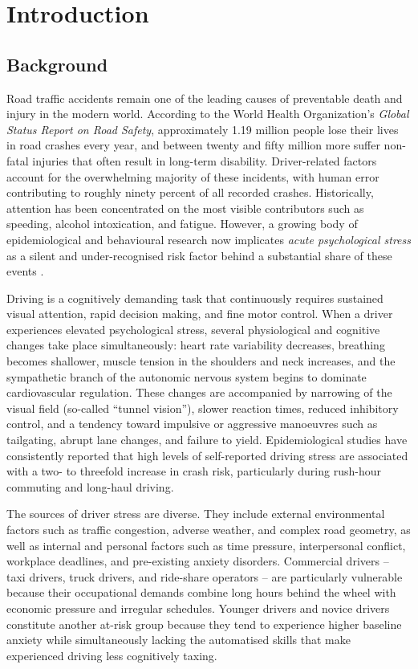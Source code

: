 \chapter{Introduction}
\label{ch:introduction}

\section{Background}
\label{sec:background}

Road traffic accidents remain one of the leading causes of preventable
death and injury in the modern world. According to the World Health
Organization's \emph{Global Status Report on Road Safety}, approximately
1.19 million people lose their lives in road crashes every year, and
between twenty and fifty million more suffer non-fatal injuries that
often result in long-term disability. Driver-related factors account
for the overwhelming majority of these incidents, with human error
contributing to roughly ninety percent of all recorded crashes.
Historically, attention has been concentrated on the most visible
contributors such as speeding, alcohol intoxication, and fatigue.
However, a growing body of epidemiological and behavioural research
now implicates \emph{acute psychological stress} as a silent and
under-recognised risk factor behind a substantial share of these
events \citep{sharma2012driver}.

Driving is a cognitively demanding task that continuously requires
sustained visual attention, rapid decision making, and fine motor
control. When a driver experiences elevated psychological stress,
several physiological and cognitive changes take place simultaneously:
heart rate variability decreases, breathing becomes shallower, muscle
tension in the shoulders and neck increases, and the sympathetic branch
of the autonomic nervous system begins to dominate cardiovascular
regulation. These changes are accompanied by narrowing of the visual
field (so-called ``tunnel vision''), slower reaction times, reduced
inhibitory control, and a tendency toward impulsive or aggressive
manoeuvres such as tailgating, abrupt lane changes, and failure to
yield. Epidemiological studies have consistently reported that high
levels of self-reported driving stress are associated with a two- to
threefold increase in crash risk, particularly during rush-hour
commuting and long-haul driving.

The sources of driver stress are diverse. They include external
environmental factors such as traffic congestion, adverse weather,
and complex road geometry, as well as internal and personal factors
such as time pressure, interpersonal conflict, workplace deadlines,
and pre-existing anxiety disorders. Commercial drivers -- taxi drivers,
truck drivers, and ride-share operators -- are particularly vulnerable
because their occupational demands combine long hours behind the wheel
with economic pressure and irregular schedules. Younger drivers and
novice drivers constitute another at-risk group because they tend to
experience higher baseline anxiety while simultaneously lacking the
automatised skills that make experienced driving less cognitively
taxing.

